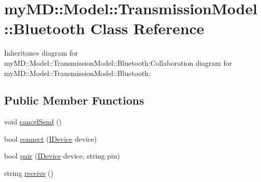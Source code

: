 \hypertarget{classmy_m_d_1_1_model_1_1_transmission_model_1_1_bluetooth}{
\section{my\-MD::Model::Transmission\-Model::Bluetooth Class Reference}
\label{da/d81/classmy_m_d_1_1_model_1_1_transmission_model_1_1_bluetooth}
}
Inheritance diagram for my\-MD::Model::Transmission\-Model::Bluetooth:Collaboration diagram for my\-MD::Model::Transmission\-Model::Bluetooth:\subsection*{Public Member Functions}
\begin{CompactItemize}
\item 
\hypertarget{classmy_m_d_1_1_model_1_1_transmission_model_1_1_bluetooth_6a1ceb92e2bcf8ccc84bcb2480cdbfaf}{
void \hyperlink{classmy_m_d_1_1_model_1_1_transmission_model_1_1_bluetooth_6a1ceb92e2bcf8ccc84bcb2480cdbfaf}{cancel\-Send} ()}
\label{da/d81/classmy_m_d_1_1_model_1_1_transmission_model_1_1_bluetooth_6a1ceb92e2bcf8ccc84bcb2480cdbfaf}

\item 
\hypertarget{classmy_m_d_1_1_model_1_1_transmission_model_1_1_bluetooth_43478467b3da629e065d78f334607510}{
bool \hyperlink{classmy_m_d_1_1_model_1_1_transmission_model_1_1_bluetooth_43478467b3da629e065d78f334607510}{connect} (\hyperlink{interfacemy_m_d_1_1_model_interface_1_1_transmission_model_interface_1_1_i_device}{IDevice} device)}
\label{da/d81/classmy_m_d_1_1_model_1_1_transmission_model_1_1_bluetooth_43478467b3da629e065d78f334607510}

\item 
\hypertarget{classmy_m_d_1_1_model_1_1_transmission_model_1_1_bluetooth_539c3bb6470710b49465ac6454e4c59c}{
bool \hyperlink{classmy_m_d_1_1_model_1_1_transmission_model_1_1_bluetooth_539c3bb6470710b49465ac6454e4c59c}{pair} (\hyperlink{interfacemy_m_d_1_1_model_interface_1_1_transmission_model_interface_1_1_i_device}{IDevice} device, string pin)}
\label{da/d81/classmy_m_d_1_1_model_1_1_transmission_model_1_1_bluetooth_539c3bb6470710b49465ac6454e4c59c}

\item 
\hypertarget{classmy_m_d_1_1_model_1_1_transmission_model_1_1_bluetooth_a81f985072900d1e17b836b9b18e0d88}{
string \hyperlink{classmy_m_d_1_1_model_1_1_transmission_model_1_1_bluetooth_a81f985072900d1e17b836b9b18e0d88}{receive} ()}
\label{da/d81/classmy_m_d_1_1_model_1_1_transmission_model_1_1_bluetooth_a81f985072900d1e17b836b9b18e0d88}


\end{CompactItemize}
